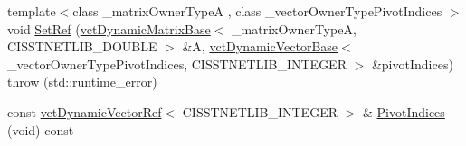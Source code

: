 \begin{DoxyCompactItemize}
{\footnotesize template$<$class \+\_\+matrix\+Owner\+Type\+A , class \+\_\+vector\+Owner\+Type\+Pivot\+Indices $>$ }\\void \hyperlink{classnmr_l_u_dynamic_data_ae456c133f5faeb23177a4a50fbb20eb7}{Set\+Ref} (\hyperlink{classvct_dynamic_matrix_base}{vct\+Dynamic\+Matrix\+Base}$<$ \+\_\+matrix\+Owner\+Type\+A, C\+I\+S\+S\+T\+N\+E\+T\+L\+I\+B\+\_\+\+D\+O\+U\+B\+L\+E $>$ \&A, \hyperlink{classvct_dynamic_vector_base}{vct\+Dynamic\+Vector\+Base}$<$ \+\_\+vector\+Owner\+Type\+Pivot\+Indices, C\+I\+S\+S\+T\+N\+E\+T\+L\+I\+B\+\_\+\+I\+N\+T\+E\+G\+E\+R $>$ \&pivot\+Indices)  throw (std\+::runtime\+\_\+error)
\item 
const \hyperlink{classvct_dynamic_vector_ref}{vct\+Dynamic\+Vector\+Ref}$<$ C\+I\+S\+S\+T\+N\+E\+T\+L\+I\+B\+\_\+\+I\+N\+T\+E\+G\+E\+R $>$ \& \hyperlink{classnmr_l_u_dynamic_data_a97a173a0a54cfc4954dbef98fafda4f1}{Pivot\+Indices} (void) const 
\end{DoxyCompactItemize}
